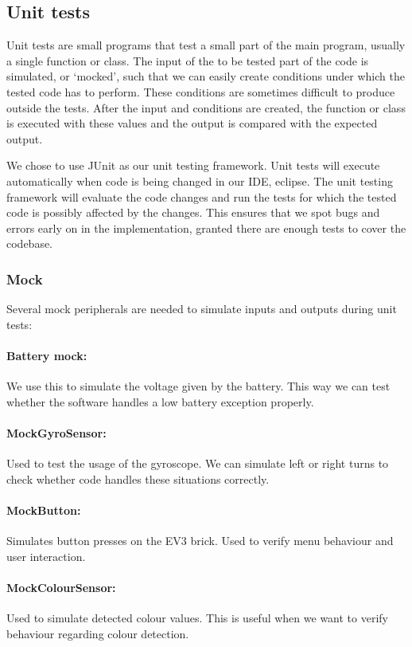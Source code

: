 \documentclass[a4paper,oneside,11pt]{article}
\begin{document}
\subsection{Unit tests}
Unit tests are small programs that test a small part of the main program, usually a single function or class. The input of the to be tested part of the code is simulated, or ‘mocked’, such that we can easily create conditions under which the tested code has to perform. These conditions are sometimes difficult to produce outside the tests. After the input and conditions are created, the function or class is executed with these values and the output is compared with the expected output.

We chose to use JUnit as our unit testing framework. Unit tests will execute automatically when code is being changed in our IDE, eclipse. The unit testing framework will evaluate the code changes and run the tests for which the tested code is possibly affected by the changes. This ensures that we spot bugs and errors early on in the implementation, granted there are enough tests to cover the codebase.

\subsubsection{Mock}
Several mock peripherals are needed to simulate inputs and outputs during unit tests:

\paragraph{Battery mock:} We use this to simulate the voltage given by the battery. This way we can test whether the software handles a low battery exception properly.

\paragraph{MockGyroSensor:} Used to test the usage of the gyroscope. We can simulate left or right turns to check whether code handles these situations correctly.

\paragraph{MockButton:} Simulates button presses on the EV3 brick. Used to verify menu behaviour and user interaction.

\paragraph{MockColourSensor:} Used to simulate detected colour values. This is useful when we want to verify behaviour regarding colour detection. 
\end{document}
